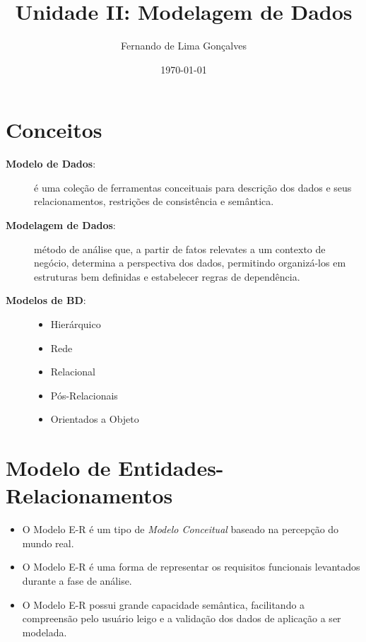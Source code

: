 \documentclass[12pt,a4paper]{article}
\title{Unidade II: Modelagem de Dados}
\author{Fernando de Lima Gonçalves}
\date{\today}
\begin{document}
\maketitle

\section{Conceitos}
\begin{description}
    \item[\textbf{Modelo de Dados}:] 
        \sloppy é uma coleção de ferramentas conceituais para descrição dos dados e  
        seus relacionamentos, restrições de consistência e semântica.
    \item[\textbf{Modelagem de Dados}:] método de análise que, a partir de fatos relevates a um contexto de negócio, 
        determina a perspectiva dos dados, permitindo organizá-los em estruturas bem definidas e estabelecer regras de dependência.
    \item[\textbf{Modelos de BD}:]\hfill
        \begin{itemize}
            \item Hierárquico
            \item Rede
            \item Relacional
            \item Pós-Relacionais
            \item Orientados a Objeto
        \end{itemize}
\end{description}

\section{Modelo de Entidades-Relacionamentos}
\begin{itemize}
    \item O Modelo E-R é um tipo de \textit{Modelo Conceitual} baseado na percepção do mundo real.
    \item O Modelo E-R é uma forma de representar os requisitos funcionais levantados durante a fase de análise.
    \item O Modelo E-R possui grande capacidade semântica, facilitando a compreensão pelo usuário leigo e a validação dos dados de aplicação a ser modelada.
\end{itemize}
\end{document}
